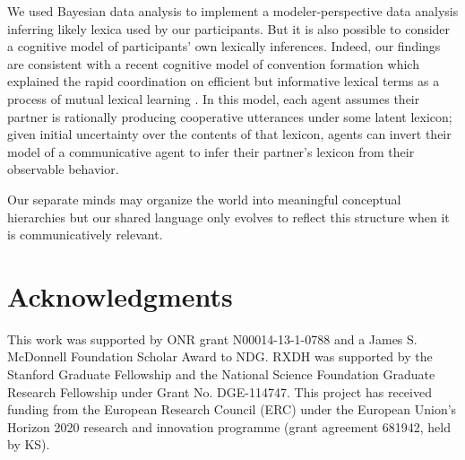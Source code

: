 \documentclass[10pt,letterpaper]{article}
\begin{document}
We used Bayesian data analysis to implement a modeler-perspective data analysis inferring likely lexica used by our participants. But it is also possible to consider a cognitive model of participants' own lexically inferences. Indeed, our findings are consistent with a recent cognitive model of convention formation which explained the rapid coordination on efficient but informative lexical terms as a process of mutual lexical learning \cite{HawkinsFrankGoodman17_ConventionFormation}. %
In this model, each agent assumes their partner is rationally producing cooperative utterances under some latent lexicon; given initial uncertainty over the contents of that lexicon, agents can invert their model of a communicative agent to infer their partner's lexicon from their observable behavior. %


Our separate minds may organize the world into meaningful conceptual hierarchies but our shared language only evolves to reflect this structure when it is communicatively relevant. 


\section{\bf Acknowledgments}
\small
This work was supported by ONR grant N00014-13-1-0788 and a James S. McDonnell Foundation Scholar Award to NDG. RXDH was supported by the Stanford Graduate Fellowship and the National Science Foundation Graduate Research Fellowship under Grant No. DGE-114747. This project has received funding from the European Research Council (ERC) under the European Union's Horizon 2020 research and innovation programme (grant agreement 681942, held by KS).



\setlength{\bibleftmargin}{.125in}
\setlength{\bibindent}{-\bibleftmargin}


\end{document}
